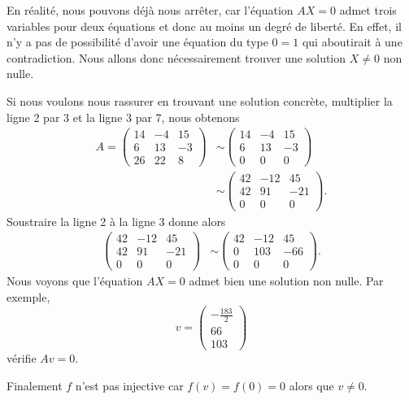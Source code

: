 {\begin{enumerate}
		En réalité, nous pouvons déjà nous arrêter, car l'équation $AX=0$ admet trois variables pour deux équations et donc au moins un degré de liberté.
		En effet, il n'y a pas de possibilité d'avoir une équation du type $0=1$ qui aboutirait à une contradiction.
		Nous allons donc nécessairement trouver une solution $X\neq0$ non nulle.
		
		Si nous voulons nous rassurer en trouvant une solution concrète, multiplier la ligne 2 par 3 et la ligne 3 par 7, nous obtenons
		\begin{align*}
			A = \begin{pmatrix} 14 & -4 & 15 \\ 6 & 13 & -3  \\ 26 & 22 & 8 \end{pmatrix}
			&\sim
			\begin{pmatrix} 14 & -4 & 15 \\ 6 & 13 & -3 \\ 0 & 0 & 0 \end{pmatrix}
			\\
			&\sim
			\begin{pmatrix} 42 & -12 & 45 \\ 42 & 91 & -21 \\ 0 & 0 & 0 \end{pmatrix}.
		\end{align*}
		Soustraire la ligne 2 à la ligne 3 donne alors
		\begin{align*}
			\begin{pmatrix} 42 & -12 & 45 \\ 42 & 91 & -21 \\ 0 & 0 & 0 \end{pmatrix}
			&\sim
			\begin{pmatrix} 42 & -12 & 45 \\ 0 & 103 & -66 \\ 0 & 0 & 0 \end{pmatrix}.
		\end{align*}
		Nous voyons que l'équation $AX=0$ admet bien une solution non nulle.
		Par exemple, 
			\[ v = \begin{pmatrix} -\frac{183}2 \\ 66 \\ 103 \end{pmatrix} \]
		vérifie $Av = 0$.
		
		Finalement $f$ n'est pas injective car $f(v) = f(0) = 0$ alors que $v\neq0$.
	\end{enumerate}
}

\fillwithlines{\fill}

